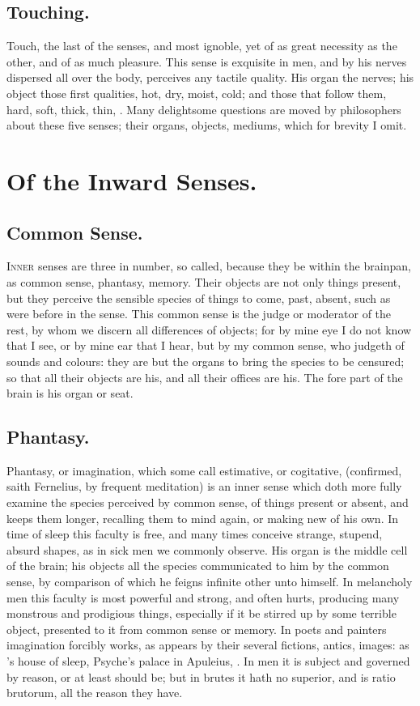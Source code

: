{\subsection{Touching.}
Touch, the last of the senses, and most ignoble, yet of as
great necessity as the other, and of as much pleasure. This sense is
exquisite in men, and by his nerves dispersed all over the body,
perceives any tactile quality. His organ the nerves; his object those
first qualities, hot, dry, moist, cold; and those that follow them,
hard, soft, thick, thin, \etc{}. Many delightsome questions are moved by
philosophers about these five senses; their organs, objects, mediums,
which for brevity I omit.

\section{Of the Inward Senses.}

\subsection{Common Sense.}
\lettrine{I}{nner} senses are three in number, so called, because
they be within the brainpan, as common sense, phantasy, memory. Their
objects are not only things present, but they perceive the sensible
species of things to come, past, absent, such as were before in the
sense. This common sense is the judge or moderator of the rest, by whom
we discern all differences of objects; for by mine eye I do not know
that I see, or by mine ear that I hear, but by my common sense, who
judgeth of sounds and colours: they are but the organs to bring the
species to be censured; so that all their objects are his, and all
their offices are his. The fore part of the brain is his organ or seat.
\subsection{Phantasy.}
Phantasy, or imagination, which some call estimative, or
cogitative, (confirmed, saith Fernelius, by frequent meditation)
is an inner sense which doth more fully examine the species perceived
by common sense, of things present or absent, and keeps them longer,
recalling them to mind again, or making new of his own. In time of
sleep this faculty is free, and many times conceive strange, stupend,
absurd shapes, as in sick men we commonly observe. His organ is the
middle cell of the brain; his objects all the species communicated to
him by the common sense, by comparison of which he feigns infinite
other unto himself. In melancholy men this faculty is most powerful and
strong, and often hurts, producing many monstrous and prodigious
things, especially if it be stirred up by some terrible object,
presented to it from common sense or memory. In poets and painters
imagination forcibly works, as appears by their several fictions,
antics, images: as \Ovid's house of sleep, Psyche's palace in Apuleius,
\etc{}. In men it is subject and governed by reason, or at least should be;
but in brutes it hath no superior, and is ratio brutorum, all the
reason they have.
}
